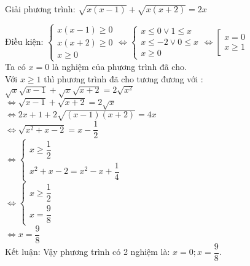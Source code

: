 \begin{baitap}
 Giải phương trình: $ \sqrt{x(x-1)} + \sqrt{x(x+2)} = 2x   $
\begin{loigiai1}
Điều kiện: $ \begin{cases}
    x(x-1 ) \geq 0 \\
    x(x+2 ) \geq 0 \\
    x \geq 0
\end{cases} 
\Leftrightarrow \begin{cases}
    x \leq 0 \vee 1 \leq x \\
    x \leq -2  \vee 0 \leq x \\
    x \geq 0
\end{cases} 
\Leftrightarrow  \left[
    \begin{array}{l}
        x =0 \\
        x \geq 1
    \end{array}
\right. $ \\
Ta có $ x=0 $ là nghiệm của phương trình đã cho.\\
Với $ x \geq 1 $ thì phương trình đã cho tương đương với : \\
$ \sqrt{x } \sqrt{x-1 } + \sqrt{x } \sqrt{x+2 } = 2 \sqrt{x^2}     $ \\
$ \Leftrightarrow \sqrt{x-1 } + \sqrt{x +2 } = 2 \sqrt{x}    $ \\
$ \Leftrightarrow 2x + 1 + 2 \sqrt{(x-1)(x+2)} = 4x $ \\
$ \Leftrightarrow \sqrt{x^2 +x -2 } = x - \dfrac{1 }{2 }  $ \\
$ \Leftrightarrow \begin{cases}
    x \geq \dfrac{1}{2 } \\
    x^2 +x -2 = x^2 -x + \dfrac{1 }{4 }  
\end{cases} $ \\
$ \Leftrightarrow 
\begin{cases}
    x \geq \dfrac{1 }{2}   \\
    x = \dfrac{9 }{8}  
\end{cases} $ \\
$ \Leftrightarrow x =\dfrac{9}{8}   $ \\

Kết luận: Vậy phương trình có 2 nghiệm là: $ x=0 ; x=\dfrac{9}{8}    $.

\end{loigiai1}

\end{baitap}
